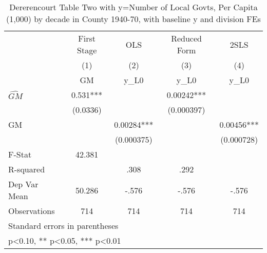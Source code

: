 \begin{table}[htbp]\centering
\def\sym#1{\ifmmode^{#1}\else\(^{#1}\)\fi}
\caption{Dererencourt Table Two with y=Number of Local Govts, Per Capita (1,000) by decade in County 1940-70, with baseline y and division FEs}
\begin{tabular}{l*{4}{c}}
\toprule
                    & First Stage   &         OLS   &Reduced Form   &        2SLS   \\
                    &\multicolumn{1}{c}{(1)}&\multicolumn{1}{c}{(2)}&\multicolumn{1}{c}{(3)}&\multicolumn{1}{c}{(4)}\\
                    &\multicolumn{1}{c}{GM}&\multicolumn{1}{c}{y\_L0}&\multicolumn{1}{c}{y\_L0}&\multicolumn{1}{c}{y\_L0}\\
\midrule
$\hat{GM}$          &       0.531***&               &     0.00242***&               \\
                    &    (0.0336)   &               &  (0.000397)   &               \\
\addlinespace
GM                  &               &     0.00284***&               &     0.00456***\\
                    &               &  (0.000375)   &               &  (0.000728)   \\
\midrule
F-Stat              &      42.381   &               &               &               \\
R-squared           &               &        .308   &        .292   &               \\
Dep Var Mean        &      50.286   &       -.576   &       -.576   &       -.576   \\
Observations        &         714   &         714   &         714   &         714   \\
\bottomrule
\multicolumn{5}{l}{\footnotesize Standard errors in parentheses}\\
\multicolumn{5}{l}{\footnotesize * p<0.10, ** p<0.05, *** p<0.01}\\
\end{tabular}
\end{table}

